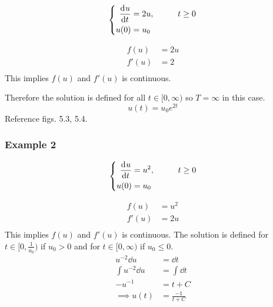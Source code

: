 \documentclass[12pt]{article}
\begin{document}
\begin{equation} \left\{
  \begin{aligned}
    \frac{\mathrm{d}^{} {u}}{\mathrm{d}{t}^{}} &= 2u,&\qquad t\ge0 \\
    u(0) &= u_0 \\
  \end{aligned}\right.
\end{equation}

\begin{equation}
  \begin{aligned}
    f(u) &= 2u \\
    f'(u) &= 2 \\
  \end{aligned}
\end{equation}
This implies $f(u)$ and $f'(u)$ is continuous.

Therefore the solution is defined for all $t\in[0,\infty)$ so $T=\infty$ in this
case.
\begin{equation}
  u(t) = u_0e^{2t}
\end{equation}
Reference figs. 5.3, 5.4.

\subsubsection{Example 2}
\begin{equation} \left\{
  \begin{aligned}
    \frac{\mathrm{d}^{} {u}}{\mathrm{d}{t}^{}} &= u^2, &\qquad t\ge0 \\
    u(0) &= u_0 \\
  \end{aligned} \right.
\end{equation}

\begin{equation}
  \begin{aligned}
    f(u) &= u^2 \\
    f'(u) &= 2u \\
  \end{aligned}
\end{equation}
This implies $f(u)$ and $f'(u)$ is continuous. The solution is defined for
$t\in[0,\frac{1}{u_0})$ if $u_0>0$ and for $t\in[0,\infty)$ if $u_0\le0$.
\begin{equation}
  \begin{aligned}
    u^{-2} \dd{u} &= \dd{t} \\
    \int u^{-2} \dd{u} &= \int \dd{t} \\
    -u^{-1} &= t+C \\
    \implies u(t) &= \frac{-1}{t+C} \\
  \end{aligned}
\end{equation}
\end{document}
